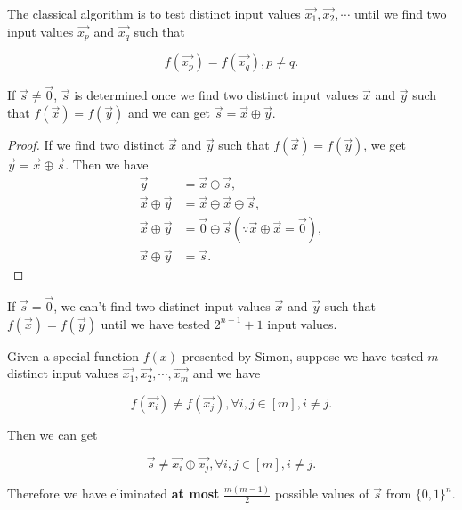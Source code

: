 The classical algorithm is to test distinct input values $\vec{x_1}, \vec{x_2}, \cdots$ until we find two input values $\vec{x_p}$ and $\vec{x_q}$ such that 

\begin{equation}
    f(\vec{x_p}) = f(\vec{x_q}),p \neq q.
\end{equation}

\begin{remark}
If $\vec{s} \neq \vec{0}$, $\vec{s}$ is determined once we find two distinct input values $\vec{x}$ and $\vec{y}$ such that $f(\vec{x})=f(\vec{y})$ and we can get $\vec{s} = \vec{x} \oplus \vec{y}$. 
\end{remark}
	\begin{proof}
		If we find two distinct $\vec{x}$ and $\vec{y}$ such that $f(\vec{x}) = f(\vec{y})$,  we get $\vec{y} =\vec{x} \oplus \vec{s}$. Then we have
		\begin{equation}
		\begin{aligned}
			\vec{y} & =\vec{x} \oplus \vec{s}, \\
			\vec{x} \oplus \vec{y} & =\vec{x} \oplus \vec{x} \oplus \vec{s}, \\
			\vec{x} \oplus \vec{y} & =\vec{0} \oplus \vec{s}(\because \vec{x} \oplus \vec{x}=\vec{0}), \\
			\vec{x} \oplus \vec{y} & =\vec{s}.
		\end{aligned}
\end{equation}
	\end{proof}

\begin{remark}
If $\vec{s} = \vec{0}$, we can't find two distinct input values $\vec{x}$ and $\vec{y}$ such that $f(\vec{x})=f(\vec{y})$ until we have tested $2^{n-1}+1$ input values.
\end{remark}

\begin{mdframed}
Given a special function $f(x)$ presented by Simon, suppose we have tested $m$ distinct input values $\vec{x_1}, \vec{x_2},\cdots, \vec{x_m}$ and we have

\begin{equation}
    f(\vec{x_i}) \neq f(\vec{x_j}), \forall i,j \in [m],i \neq j.
\end{equation} 

Then we can get

\begin{equation}
    \vec{s} \neq \vec{x_i} \oplus \vec{x_j}, \forall i,j \in [m],i \neq j.
\end{equation}

Therefore we have eliminated \textbf{at most} $\frac{m(m-1)}{2}$ possible values of $\vec{s}$ from $\{0,1\}^n$.
\end{mdframed}

